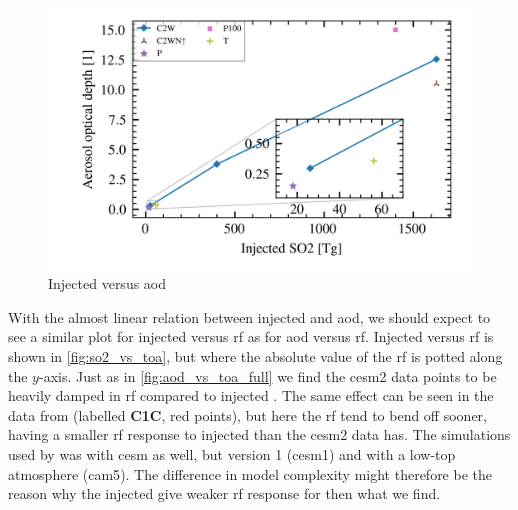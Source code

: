 \documentclass[twocol]{ametsocV5}
\newcommand{\iso}[1][i]{{#1}njected \ce{SO2}}
\begin{document}
\begin{figure}[t]
  \begin{center}
    \includegraphics[width=0.95\linewidth]{figures/injection_vs_aod.png}
  \end{center}
  \caption{Injected  versus \acrshort{aod}}%
  \label{fig:so2_vs_aod}
\end{figure}

With the almost linear relation between injected  and \acrshort{aod}, we should
expect to see a similar plot for \iso{} versus \acrshort{rf} as for \acrshort{aod}
versus \acrshort{rf}. \iso[I] versus \acrshort{rf} is shown in \cref{fig:so2_vs_toa},
but where the absolute value of the \acrshort{rf} is potted along the \( y \)-axis. Just
as in \cref{fig:aod_vs_toa_full} we find the \acrshort{cesm2} data points to be heavily
damped in \acrshort{rf} compared to \iso. The same effect can be seen in the data from
\citet{ottobliesner2016} (labelled \textbf{C1C}, red points), but here the \acrshort{rf}
tend to bend off sooner, having a smaller \acrshort{rf} response to \iso{} than the
\acrshort{cesm2} data has. The simulations used by \citet{ottobliesner2016} was with
\acrshort{cesm} as well, but version 1 (\acrshort{cesm1}) and with a low-top atmosphere
(\acrshort{cam5}). The difference in model complexity might therefore be the reason why
the \iso{} give weaker \acrshort{rf} response for \citet{ottobliesner2016} then what we
find.
\end{document}
